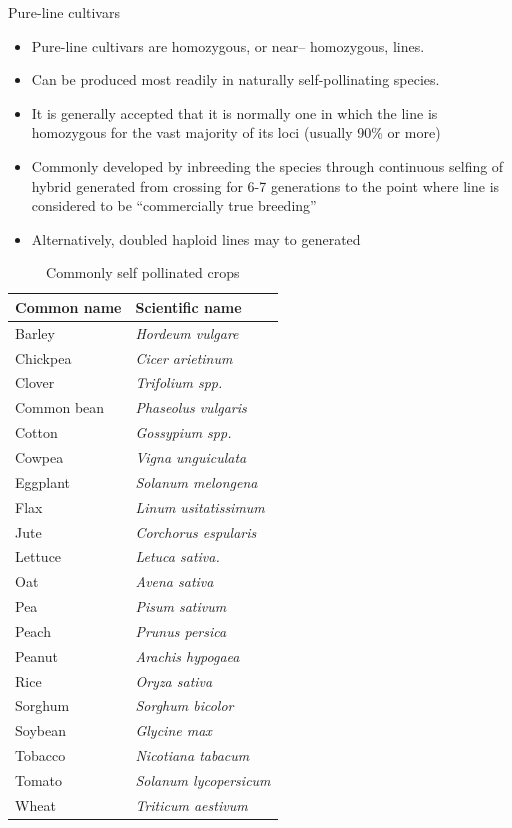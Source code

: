 \documentclass[11pt,ignorenonframetext,aspectratio=169]{beamer}
\providecommand{\tightlist}{%
  \setlength{\itemsep}{0pt}\setlength{\parskip}{0pt}}
\begin{document}
\begin{frame}{Pure-line cultivars}
\protect\hypertarget{pure-line-cultivars}{}
\begin{itemize}
\tightlist
\item
  Pure-line cultivars are homozygous, or near-- homozygous, lines.
\item
  Can be produced most readily in naturally self-pollinating species.
\item
  It is generally accepted that it is normally one in which the line is
  homozygous for the vast majority of its loci (usually 90\% or more)
\item
  Commonly developed by inbreeding the species through continuous
  selfing of hybrid generated from crossing for 6-7 generations to the
  point where line is considered to be ``commercially true breeding''
\item
  Alternatively, doubled haploid lines may to generated
\end{itemize}
\end{frame}

\begin{frame}{}
\protect\hypertarget{section-21}{}
\begin{table}

\caption{\label{tab:predominantly-self-pollinated}Commonly self pollinated crops}
\centering
\fontsize{6}{8}\selectfont
\begin{tabular}[t]{ll}
\toprule
Common name & Scientific name\\
\midrule
Barley & \textit{Hordeum vulgare}\\
Chickpea & \textit{Cicer arietinum}\\
Clover & \textit{Trifolium spp.}\\
Common bean & \textit{Phaseolus vulgaris}\\
Cotton & \textit{Gossypium spp.}\\
\addlinespace
Cowpea & \textit{Vigna unguiculata}\\
Eggplant & \textit{Solanum melongena}\\
Flax & \textit{Linum usitatissimum}\\
Jute & \textit{Corchorus espularis}\\
Lettuce & \textit{Letuca sativa.}\\
\addlinespace
Oat & \textit{Avena sativa}\\
Pea & \textit{Pisum sativum}\\
Peach & \textit{Prunus persica}\\
Peanut & \textit{Arachis hypogaea}\\
Rice & \textit{Oryza sativa}\\
\addlinespace
Sorghum & \textit{Sorghum bicolor}\\
Soybean & \textit{Glycine max}\\
Tobacco & \textit{Nicotiana tabacum}\\
Tomato & \textit{Solanum lycopersicum}\\
Wheat & \textit{Triticum aestivum}\\
\bottomrule
\end{tabular}
\end{table}
\end{frame}
\end{document}
